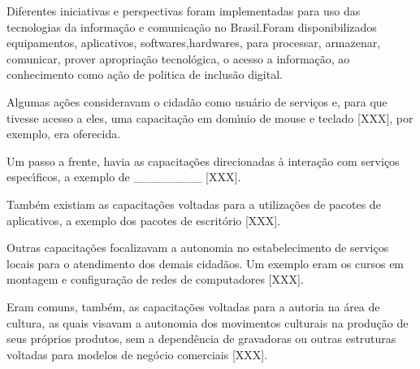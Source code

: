 \documentclass[
12pt,		%
openright,	%
twoside,  %
a4paper,			%
chapter=TITLE,		%
english,			%
french,				%
spanish,			%
brazil				%
]{USPSC-classe/USPSC}
\begin{document}
Diferentes iniciativas e perspectivas foram implementadas para uso das tecnologias da informa\c{c}\~ao e comunica\c{c}\~ao no Brasil.Foram disponibilizados equipamentos, aplicativos, softwares,hardwares, para processar, armazenar, comunicar, prover apropria\c{c}\~ao tecnol\'ogica, o acesso a  informa\c{c}\~ao, ao conhecimento como a\c{c}\~ao de politica de inclus\~ao digital.














Algumas a\c{c}\~oes consideravam o cidad\~ao como usu\'ario de servi\c{c}os e, para que tivesse acesso a eles, uma capacita\c{c}\~ao em dom\'{\i}nio de mouse e teclado [XXX], por exemplo, era oferecida.














Um passo a frente, havia as capacita\c{c}\~oes direcionadas \`a intera\c{c}\~ao com servi\c{c}os espec\'{\i}ficos, a exemplo de \_\_\_\_\_\_\_\_ [XXX].














Tamb\'em existiam as capacita\c{c}\~oes voltadas para a utiliza\c{c}\~oes de pacotes de aplicativos, a exemplo dos pacotes de escrit\'orio [XXX].














Outras capacita\c{c}\~oes focalizavam a autonomia no estabelecimento de servi\c{c}os locais para o atendimento dos demais cidad\~aos. Um exemplo eram os cursos em montagem e configura\c{c}\~ao de redes de computadores [XXX].














Eram comuns, tamb\'em, as capacita\c{c}\~oes voltadas para a autoria na \'area de cultura, as quais visavam a autonomia dos movimentos culturais na produ\c{c}\~ao de seus pr\'oprios produtos, sem a depend\^encia de gravadoras ou outras estruturas voltadas para modelos de neg\'ocio comerciais [XXX].
\end{document}
